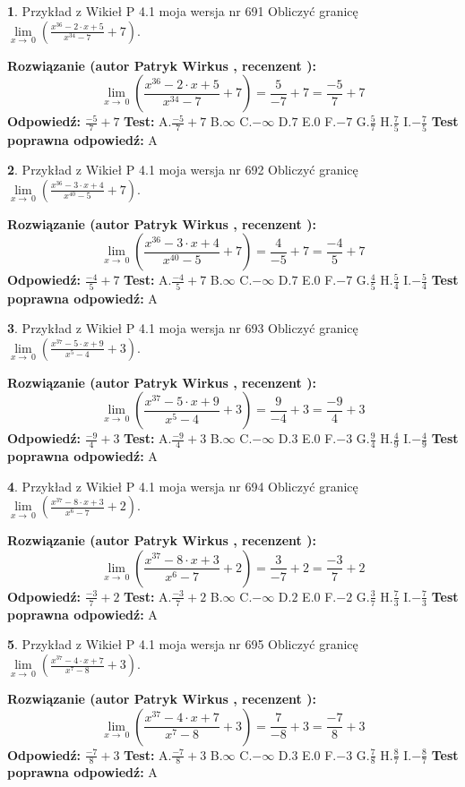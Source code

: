 \documentclass[12pt, a4paper]{article}
\theoremstyle{definition} %
\newtheorem{zad}{}
\newcommand{\zadStart}[1]{\begin{zad}#1\newline}
\newcommand{\zadStop}{\end{zad}}
\newcommand{\rozwStart}[2]{\noindent \textbf{Rozwiązanie (autor #1 , recenzent #2): }\newline}
\newcommand{\rozwStop}{\newline}
\newcommand{\odpStart}{\noindent \textbf{Odpowiedź:}\newline}
\newcommand{\odpStop}{\newline}
\newcommand{\testStart}{\noindent \textbf{Test:}\newline}
\newcommand{\testStop}{\newline}
\newcommand{\kluczStart}{\noindent \textbf{Test poprawna odpowiedź:}\newline}
\newcommand{\kluczStop}{\newline}
\begin{document}
\zadStart{Przykład z Wikieł P 4.1 moja wersja nr 691}
Obliczyć granicę $\lim\limits_{x\to\ 0}(\frac{x^{36}-2 \cdot x +5}{x^{34}-7}+7)$.
\zadStop
\rozwStart{Patryk Wirkus}{}
$$\lim\limits_{x\to\ 0}(\frac{x^{36}-2 \cdot x +5}{x^{34}-7}+7)=\frac{5}{-7}+7=\frac{-5}{7}+7$$
\rozwStop
\odpStart
$\frac{-5}{7}+7$
\odpStop
\testStart
A.$\frac{-5}{7}+7$
B.$\infty$
C.$-\infty$
D.$7$
E.$0$
F.$-7$
G.$\frac{5}{7}$
H.$\frac{7}{5}$
I.$-\frac{7}{5}$
\testStop
\kluczStart
A
\kluczStop



\zadStart{Przykład z Wikieł P 4.1 moja wersja nr 692}
Obliczyć granicę $\lim\limits_{x\to\ 0}(\frac{x^{36}-3 \cdot x +4}{x^{40}-5}+7)$.
\zadStop
\rozwStart{Patryk Wirkus}{}
$$\lim\limits_{x\to\ 0}(\frac{x^{36}-3 \cdot x +4}{x^{40}-5}+7)=\frac{4}{-5}+7=\frac{-4}{5}+7$$
\rozwStop
\odpStart
$\frac{-4}{5}+7$
\odpStop
\testStart
A.$\frac{-4}{5}+7$
B.$\infty$
C.$-\infty$
D.$7$
E.$0$
F.$-7$
G.$\frac{4}{5}$
H.$\frac{5}{4}$
I.$-\frac{5}{4}$
\testStop
\kluczStart
A
\kluczStop



\zadStart{Przykład z Wikieł P 4.1 moja wersja nr 693}
Obliczyć granicę $\lim\limits_{x\to\ 0}(\frac{x^{37}-5 \cdot x +9}{x^{5}-4}+3)$.
\zadStop
\rozwStart{Patryk Wirkus}{}
$$\lim\limits_{x\to\ 0}(\frac{x^{37}-5 \cdot x +9}{x^{5}-4}+3)=\frac{9}{-4}+3=\frac{-9}{4}+3$$
\rozwStop
\odpStart
$\frac{-9}{4}+3$
\odpStop
\testStart
A.$\frac{-9}{4}+3$
B.$\infty$
C.$-\infty$
D.$3$
E.$0$
F.$-3$
G.$\frac{9}{4}$
H.$\frac{4}{9}$
I.$-\frac{4}{9}$
\testStop
\kluczStart
A
\kluczStop



\zadStart{Przykład z Wikieł P 4.1 moja wersja nr 694}
Obliczyć granicę $\lim\limits_{x\to\ 0}(\frac{x^{37}-8 \cdot x +3}{x^{6}-7}+2)$.
\zadStop
\rozwStart{Patryk Wirkus}{}
$$\lim\limits_{x\to\ 0}(\frac{x^{37}-8 \cdot x +3}{x^{6}-7}+2)=\frac{3}{-7}+2=\frac{-3}{7}+2$$
\rozwStop
\odpStart
$\frac{-3}{7}+2$
\odpStop
\testStart
A.$\frac{-3}{7}+2$
B.$\infty$
C.$-\infty$
D.$2$
E.$0$
F.$-2$
G.$\frac{3}{7}$
H.$\frac{7}{3}$
I.$-\frac{7}{3}$
\testStop
\kluczStart
A
\kluczStop



\zadStart{Przykład z Wikieł P 4.1 moja wersja nr 695}
Obliczyć granicę $\lim\limits_{x\to\ 0}(\frac{x^{37}-4 \cdot x +7}{x^{7}-8}+3)$.
\zadStop
\rozwStart{Patryk Wirkus}{}
$$\lim\limits_{x\to\ 0}(\frac{x^{37}-4 \cdot x +7}{x^{7}-8}+3)=\frac{7}{-8}+3=\frac{-7}{8}+3$$
\rozwStop
\odpStart
$\frac{-7}{8}+3$
\odpStop
\testStart
A.$\frac{-7}{8}+3$
B.$\infty$
C.$-\infty$
D.$3$
E.$0$
F.$-3$
G.$\frac{7}{8}$
H.$\frac{8}{7}$
I.$-\frac{8}{7}$
\testStop
\kluczStart
A
\kluczStop
\end{document}

